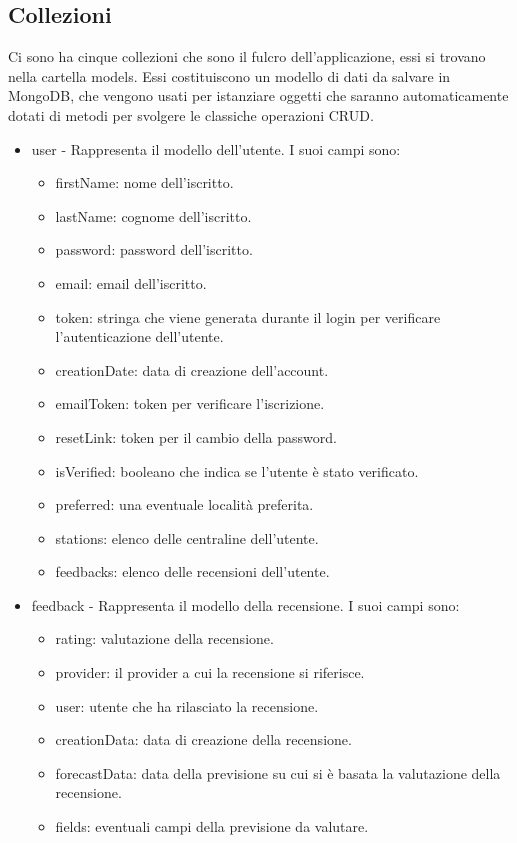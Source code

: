 \subsection{Collezioni}
Ci sono ha cinque collezioni che sono il fulcro dell'applicazione, essi si trovano nella cartella models. Essi costituiscono un modello di dati da salvare in MongoDB, che vengono usati per istanziare oggetti che saranno automaticamente dotati di metodi per svolgere le classiche operazioni CRUD.
\begin{itemize}
\item user - Rappresenta il modello dell'utente. I suoi campi sono:
\begin{itemize}
\item firstName: nome dell'iscritto.
\item lastName: cognome dell'iscritto.
\item password: password dell'iscritto.
\item email: email dell'iscritto.
\item token: stringa che viene generata durante il login per verificare l'autenticazione dell'utente.
\item creationDate: data di creazione dell'account.
\item emailToken: token per verificare l'iscrizione.
\item resetLink: token per il cambio della password.
\item isVerified: booleano che indica se l'utente è stato verificato.
\item preferred: una eventuale località preferita.
\item stations: elenco delle centraline dell'utente.
\item feedbacks: elenco delle recensioni dell'utente.
\end{itemize}
\item feedback - Rappresenta il modello della recensione. I suoi campi sono: 
\begin{itemize}
    \item rating: valutazione della recensione. 
    \item provider: il provider a cui la recensione si riferisce.
    \item user: utente che ha rilasciato la recensione.
    \item creationData: data di creazione della recensione.
    \item forecastData: data della previsione su cui si è basata la valutazione della recensione.
    \item fields: eventuali campi della previsione da valutare.

\end{itemize}
\end{itemize}
